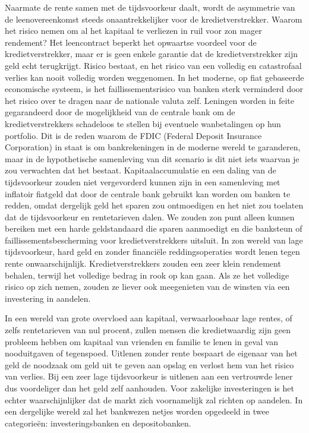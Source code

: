 \documentclass[
  a5paper,
  smalldemyvopaper,11pt,twoside,onecolumn,openright,extrafontsizes,
hidelinks]{memoir}
\begin{document}
Naarmate de rente samen met de tijdsvoorkeur daalt, wordt de asymmetrie
van de leenovereenkomst steeds onaantrekkelijker voor de
kredietverstrekker. Waarom het risico nemen om al het kapitaal te
verliezen in ruil voor zon mager rendement? Het leencontract beperkt het
opwaartse voordeel voor de kredietverstrekker, maar er is geen enkele
garantie dat de kredietverstrekker zijn geld echt terugkrijgt. Risico
bestaat, en het risico van een volledig en catastrofaal verlies kan
nooit volledig worden weggenomen. In het moderne, op fiat gebaseerde
economische systeem, is het faillissementsrisico van banken sterk
verminderd door het risico over te dragen naar de nationale valuta zelf.
Leningen worden in feite gegarandeerd door de mogelijkheid van de
centrale bank om de kredietverstrekkers schadeloos te stellen bij
eventuele wanbetalingen op hun portfolio. Dit is de reden waarom de FDIC
(Federal Deposit Insurance Corporation) in staat is om bankrekeningen in
de moderne wereld te garanderen, maar in de hypothetische samenleving
van dit scenario is dit niet iets waarvan je zou verwachten dat het
bestaat. Kapitaalaccumulatie en een daling van de tijdsvoorkeur zouden
niet vergevorderd kunnen zijn in een samenleving met inflatoir fiatgeld
dat door de centrale bank gebruikt kan worden om banken te redden, omdat
dergelijk geld het sparen zou ontmoedigen en het niet zou toelaten dat
de tijdsvoorkeur en rentetarieven dalen. We zouden zon punt alleen
kunnen bereiken met een harde geldstandaard die sparen aanmoedigt en die
banksteun of faillissementsbescherming voor kredietverstrekkers
uitsluit. In zon wereld van lage tijdsvoorkeur, hard geld en zonder
financiële reddingsoperaties wordt lenen tegen rente onwaarschijnlijk.
Kredietverstrekkers zouden een zeer klein rendement behalen, terwijl het
volledige bedrag in rook op kan gaan. Als ze het volledige risico op
zich nemen, zouden ze liever ook meegenieten van de winsten via een
investering in aandelen.

In een wereld van grote overvloed aan kapitaal, verwaarloosbaar lage
rentes, of zelfs rentetarieven van nul procent, zullen mensen die
kredietwaardig zijn geen probleem hebben om kapitaal van vrienden en
familie te lenen in geval van nooduitgaven of tegenspoed. Uitlenen
zonder rente bespaart de eigenaar van het geld de noodzaak om geld uit
te geven aan opslag en verlost hem van het risico van verlies. Bij een
zeer lage tijdsvoorkeur is uitlenen aan een vertrouwde lener dus
voordeliger dan het geld zelf aanhouden. Voor zakelijke investeringen is
het echter waarschijnlijker dat de markt zich voornamelijk zal richten
op aandelen. In een dergelijke wereld zal het bankwezen netjes worden
opgedeeld in twee categorieën: investeringsbanken en depositobanken.
\end{document}
